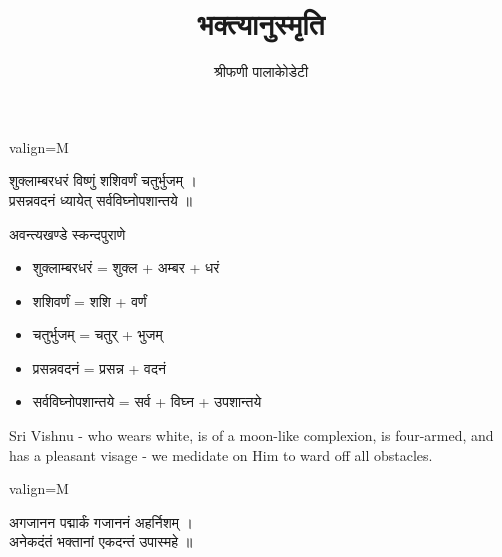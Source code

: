 \documentclass{book}
\title{भक्त्यानुस्मृति}
\author{श्रीफणी पालाकोेडेटी}
\date{}
\newenvironment{Verse}[1][]
  {\bigskip\noindent\begin{center}\begin{adjustbox}{valign=M}\begin{tcolorbox}[colframe=black,colback=white,boxrule=0.5mm,arc=4mm,auto outer arc,left=2mm,right=2mm,top=2mm,bottom=2mm,halign=center]
  \LARGE\bfseries#1\par\varwidth{\linewidth}\centering}
  {\endvarwidth\end{tcolorbox}\end{adjustbox}\end{center}\bigskip}
\begin{document}
\maketitle

\begin{Verse}
    शुक्लाम्बरधरं विष्णुं शशिवर्णं चतुर्भुजम् ।\\
    प्रसन्नवदनं ध्यायेत् सर्वविघ्नोपशान्तये ॥
\end{Verse}

\vspace{-2em} %
\begin{center}
    अवन्त्यखण्डे स्कन्दपुराणे
\end{center}
\vspace{2em}

\begin{multicols}{2}
    \setlength{\columnseprule}{0.4pt}
    \begin{itemize}
        \item शुक्लाम्बरधरं = शुक्ल + अम्बर + धरं
        \item शशिवर्णं = शशि + वर्णं
        \item चतुर्भुजम् = चतुर् + भुजम्
        \item प्रसन्नवदनं = प्रसन्न + वदनं
        \item सर्वविघ्नोपशान्तये = सर्व + विघ्न + उपशान्तये
    \end{itemize}

    \columnbreak
    
    \textenglish{
        \noindent Sri Vishnu - who wears white, is of a moon-like complexion, is four-armed,
        and has a pleasant visage - we medidate on Him to ward off all obstacles.
    }

\end{multicols}

\clearpage

\begin{Verse}
    अगजानन पद्मार्कं गजाननं अहर्निशम् ।\\
    अनेकदंतं भक्तानां एकदन्तं उपास्महे ॥
\end{Verse}
\end{document}
